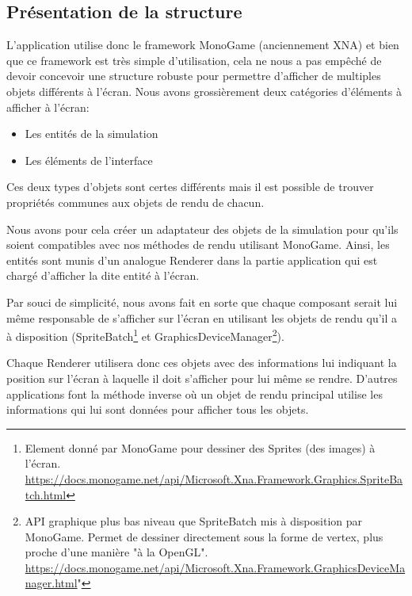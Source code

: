 \documentclass{EPUProjetDi}
\begin{document}
\subsection{Présentation de la structure}

L'application utilise donc le framework MonoGame (anciennement XNA) et bien que ce framework est très simple d'utilisation, cela ne nous a 
pas empêché de devoir concevoir une structure robuste pour permettre d'afficher de multiples objets différents à l'écran.
Nous avons grossièrement deux catégories d'éléments à afficher à l'écran:
\begin{itemize}
    \item Les entités de la simulation
    \item Les éléments de l'interface
\end{itemize}

Ces deux types d'objets sont certes différents mais il est possible de trouver propriétés communes aux objets de rendu de chacun.

Nous avons pour cela créer un adaptateur des objets de la simulation pour qu'ils soient compatibles avec nos méthodes de rendu 
utilisant MonoGame. Ainsi, les entités sont munis d'un analogue Renderer dans la partie application qui est chargé d'afficher la dite 
entité à l'écran.

Par souci de simplicité, nous avons fait en sorte que chaque composant serait lui même responsable de s'afficher sur l'écran en utilisant les
objets de rendu qu'il a à disposition (SpriteBatch\footnote{Element donné par MonoGame pour dessiner des Sprites (des images) à l'écran. 
\url{https://docs.monogame.net/api/Microsoft.Xna.Framework.Graphics.SpriteBatch.html}} et GraphicsDeviceManager\footnote{API graphique plus
bas niveau que SpriteBatch mis à disposition par MonoGame. Permet de dessiner directement sous la forme de vertex, plus proche d'une manière "à la 
OpenGL". \url{https://docs.monogame.net/api/Microsoft.Xna.Framework.GraphicsDeviceManager.html}"}).

Chaque Renderer utilisera donc ces objets avec des informations lui indiquant la position sur l'écran à laquelle il doit s'afficher pour
lui même se rendre. D'autres applications font la méthode inverse où un objet de rendu principal utilise les informations qui lui sont 
données pour afficher tous les objets.
\end{document}
